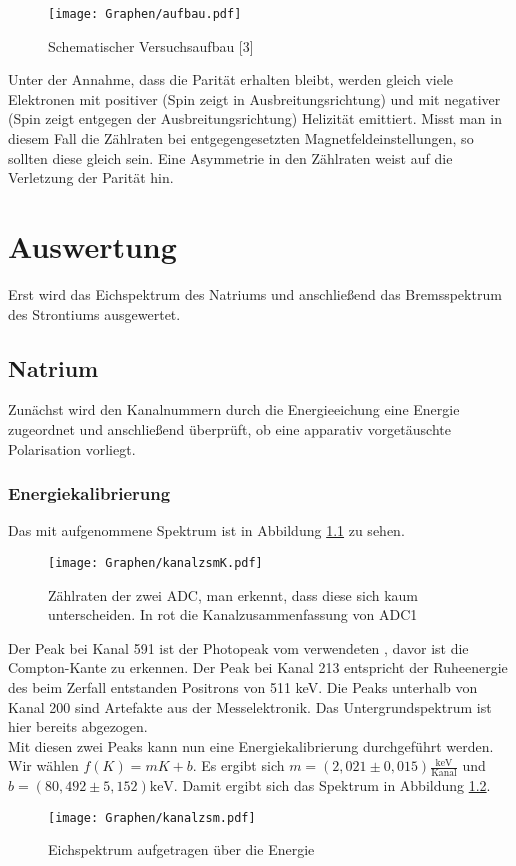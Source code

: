\documentclass[twoside,colorback,accentcolor=tud4c,11pt]{tudreport}
\begin{document}
  
\begin{figure}[H]
\centering
   	\begin{minipage}[b]{1\textwidth}
   	\texttt{[image: Graphen/aufbau.pdf]}
   	\caption{Schematischer Versuchsaufbau [3]}
  	\label{Aa}
   	\end{minipage}
\end{figure}  


Unter der Annahme, dass die Parität erhalten bleibt, werden gleich viele Elektronen mit positiver (Spin zeigt in Ausbreitungsrichtung) und mit negativer (Spin zeigt entgegen der Ausbreitungsrichtung) Helizität emittiert. Misst man in diesem Fall die Zählraten bei entgegengesetzten Magnetfeldeinstellungen, so sollten diese gleich sein. Eine Asymmetrie in den Zählraten weist auf die Verletzung der Parität hin. 
     	     	
\chapter{Auswertung}
Erst wird das Eichspektrum des Natriums und anschließend das Bremsspektrum des Strontiums ausgewertet.
\section{Natrium}
Zunächst wird den Kanalnummern durch die Energieeichung eine Energie zugeordnet und anschließend überprüft, ob eine apparativ vorgetäuschte Polarisation vorliegt.
\subsection{Energiekalibrierung}
Das mit  aufgenommene Spektrum ist in Abbildung \ref{fig:kanalK} zu sehen.
\begin{figure}[H]
\centering
   	\begin{minipage}[b]{\textwidth}
   	\texttt{[image: Graphen/kanalzsmK.pdf]}
   	\caption{Zählraten der zwei ADC, man erkennt, dass diese sich kaum unterscheiden. In rot die Kanalzusammenfassung von ADC1}
  	\label{fig:kanalK}
   	\end{minipage}
\end{figure}
Der Peak bei Kanal 591 ist der Photopeak vom verwendeten , davor ist die Compton-Kante zu erkennen. Der Peak bei Kanal 213 entspricht der Ruheenergie des beim Zerfall entstanden Positrons von 511 keV. Die Peaks unterhalb von Kanal 200 sind Artefakte aus der Messelektronik. Das Untergrundspektrum ist hier bereits abgezogen.\\
Mit diesen zwei Peaks kann nun eine Energiekalibrierung durchgeführt werden. Wir wählen $ f(K)=mK+b $. Es ergibt sich $ m=(2,021\pm0,015)\frac{\text{keV}}{\text{Kanal}} $ und $ b=(80,492\pm5,152) \text{keV}$. Damit ergibt sich das Spektrum in Abbildung \ref{fig:kanal}.
\begin{figure}[H]
\centering
   	\begin{minipage}[b]{\textwidth}
   	\centering
   	\texttt{[image: Graphen/kanalzsm.pdf]}
   	\caption{Eichspektrum aufgetragen über die Energie}
  	\label{fig:kanal}
   	\end{minipage}
\end{figure}
\end{document}
